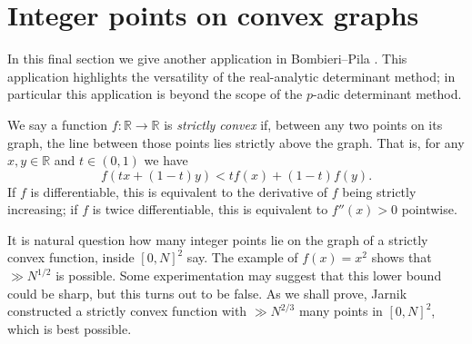 \documentclass[12pt]{amsart}
\newcommand{\1}{{\mathbf 1}}
\theoremstyle{remark}
\theoremstyle{definition}
\begin{document}
\section{Integer points on convex graphs}\label{convex}
In this final section we give another application in Bombieri--Pila \cite{BP89}. This application highlights the versatility of the real-analytic determinant method; in particular this application is beyond the scope of the $p$-adic determinant method.

We say a function $f:\mathbb{R}\to \mathbb{R}$ is {\it strictly convex} if, between any two points on its graph, the line between those points lies strictly above the graph. That is, for any $x,y\in \mathbb{R}$ and $t\in (0,1)$ we have
\[f(tx+(1-t)y)<tf(x)+(1-t)f(y).\]
If $f$ is differentiable, this is equivalent to the derivative of $f$ being strictly increasing; if $f$ is twice differentiable, this is equivalent to $f''(x)>0$ pointwise.

It is natural question how many integer points lie on the graph of a strictly convex function, inside $[0,N]^2$ say. The example of $f(x)=x^2$ shows that $\gg N^{1/2}$ is possible. Some experimentation may suggest that this lower bound could be sharp, but this turns out to be false. As we shall prove, Jarnik \cite{Ja26} constructed a strictly convex function with $\gg N^{2/3}$ many points in $[0,N]^2$, which is best possible.
\end{document}
